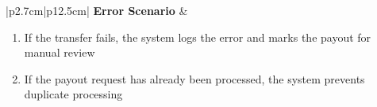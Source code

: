 \begin{table}[H]
\begin{tabular}{|p{2.7cm}|p{12.5cm}|}
        \hline
        \textbf{Error Scenario} & \begin{minipage}[t]{\linewidth}
                                      \begin{enumerate}[topsep=0pt,itemsep=1pt,parsep=0pt,partopsep=0pt]
                                          \item If the transfer fails, the system logs the error and marks the payout for
                                                manual review
                                          \item If the payout request has already been processed, the system prevents duplicate
                                                processing
                                      \end{enumerate}
                                  \end{minipage} \\
        \hline
    \end{tabular}
    \label{tab:admin-payout}
\end{table}
